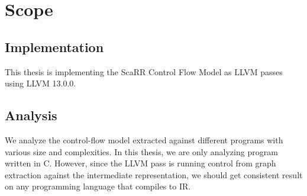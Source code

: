 
\chapter{Scope} %


\label{Chapter2} %

\section{Implementation}
This thesis is implementing the ScaRR Control Flow Model as LLVM passes using LLVM 13.0.0. 

\section{Analysis}

We analyze the control-flow model extracted against different programs with various size and complexities. In this thesis, we are only analyzing program written in C. However, since the LLVM pass is running control from graph extraction against the intermediate representation, we should get consistent result on any programming language that compiles to IR.